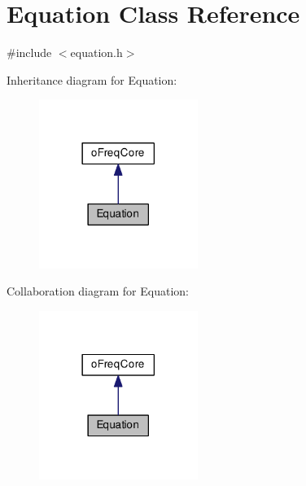 \hypertarget{class_equation}{\section{Equation Class Reference}
\label{class_equation}
}


{\ttfamily \#include $<$equation.\-h$>$}



Inheritance diagram for Equation\-:\nopagebreak
\begin{figure}[H]
\begin{center}
\leavevmode
\includegraphics[width=146pt]{class_equation__inherit__graph}
\end{center}
\end{figure}


Collaboration diagram for Equation\-:\nopagebreak
\begin{figure}[H]
\begin{center}
\leavevmode
\includegraphics[width=146pt]{class_equation__coll__graph}
\end{center}
\end{figure}
